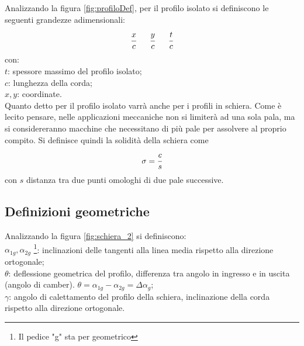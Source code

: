 Analizzando la figura \ref{fig:profiloDef}, per il profilo isolato si definiscono le seguenti grandezze adimensionali:
\begin{align*}
\cfrac{x}{c} \;\;\;\;\;\; \cfrac{y}{c} \;\;\;\;\;\; \cfrac{t}{c}
\end{align*}
con:\\[1mm]
$t$: spessore massimo del profilo isolato;\\
$c$: lunghezza della corda;\\
$x,y$: coordinate.\\[2mm]
Quanto detto per il profilo isolato varrà anche per i profili in schiera. Come è lecito pensare, nelle applicazioni meccaniche non si limiterà ad una sola pala, ma si considereranno macchine che necessitano di più pale per assolvere al proprio compito. Si definisce quindi la solidità della schiera come
\begin{equation}
\sigma = \cfrac{c}{s}
\end{equation}
con $s$ distanza tra due punti omologhi di due pale successive.
\subsection{Definizioni geometriche}
Analizzando la figura \ref{fig:schiera_2} si definiscono:\\[1mm]
$\alpha_{1g}, \alpha_{2g}$ \footnote{Il pedice "g" sta per geometrico}: inclinazioni delle tangenti alla linea media rispetto alla direzione ortogonale;\\
$\theta$: deflessione geometrica del profilo, differenza tra angolo in ingresso e in uscita (angolo di camber). $\theta = \alpha_{1g} - \alpha_{2g} = \Delta \alpha_{g}$;\\
$\gamma$: angolo di calettamento del profilo della schiera, inclinazione della corda rispetto alla direzione ortogonale.\\
